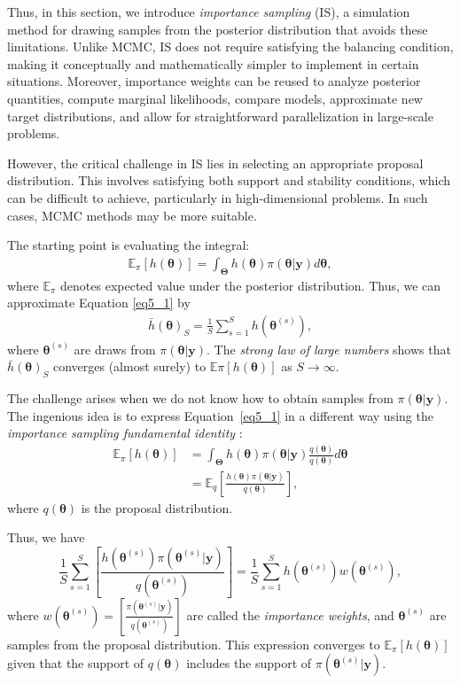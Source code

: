 Thus, in this section, we introduce \textit{importance sampling} (IS), a simulation method for drawing samples from the posterior distribution that avoids these limitations. Unlike MCMC, IS does not require satisfying the balancing condition, making it conceptually and mathematically simpler to implement in certain situations. Moreover, importance weights can be reused to analyze posterior quantities, compute marginal likelihoods, compare models, approximate new target distributions, and allow for straightforward parallelization in large-scale problems.

However, the critical challenge in IS lies in selecting an appropriate proposal distribution. This involves satisfying both support and stability conditions, which can be difficult to achieve, particularly in high-dimensional problems. In such cases, MCMC methods may be more suitable.

The starting point is evaluating the integral:
\begin{align}\label{eq5_1}
	\mathbb{E}_{\pi}[h(\bm{\theta})]=\int_{\bm{\Theta}} h(\bm{\theta}) \pi(\bm{\theta}|\bm{y})d\bm{\theta},
\end{align}
where $\mathbb{E}_{\pi}$ denotes expected value under the posterior distribution.
Thus, we can approximate Equation \ref{eq5_1} by
\begin{align}\label{eq5_2}
	\bar{h}(\bm{\theta})_S=\frac{1}{S}\sum_{s=1}^S h(\bm{\theta}^{(s)}), 
\end{align}
where $\bm{\theta}^{(s)}$ are draws from $\pi(\bm{\theta}|\bm{y})$. The \textit{strong law of large numbers} shows that $\bar{h}(\bm{\theta})_S$ converges (almost surely) to $\mathbb{E}{\pi}[h(\bm{\theta})]$ as $S \rightarrow \infty$.

The challenge arises when we do not know how to obtain samples from $\pi(\bm{\theta}|\bm{y})$. The ingenious idea is to express Equation~\ref{eq5_1} in a different way using the \textit{importance sampling fundamental identity} \cite[Chap.~3]{robert2011monte}:
\begin{align}\label{eq5_3}
	\mathbb{E}_{\pi}[h(\bm{\theta})]&=\int_{\bm{\Theta}} h(\bm{\theta}) \pi(\bm{\theta}|\bm{y})\frac{q(\bm{\theta})}{q(\bm{\theta})}d\bm{\theta}\nonumber\\
	&=\mathbb{E}_{q}\left[\frac{h(\bm{\theta})\pi(\bm{\theta}|\bm{y})}{q(\bm{\theta})}\right],
\end{align}   
where $q(\bm{\theta})$ is the proposal distribution.

Thus, we have $$\frac{1}{S}\sum_{s=1}^S \left[\frac{h(\bm{\theta}^{(s)})\pi(\bm{\theta}^{(s)}|\bm{y})}{q(\bm{\theta}^{(s)})}\right]= \frac{1}{S}\sum_{s=1}^S h(\bm{\theta}^{(s)})w(\bm{\theta}^{(s)}),$$ where $w(\bm{\theta}^{(s)})= \left[\frac{\pi(\bm{\theta}^{(s)}|\bm{y})}{q(\bm{\theta}^{(s)})}\right]$ are called the \textit{importance weights}, and $\bm{\theta}^{(s)}$ are samples from the proposal distribution. This expression converges to $\mathbb{E}_{\pi}[h(\bm{\theta})]$ given that the support of $q(\bm{\theta})$ includes the support of $\pi(\bm{\theta}^{(s)}|\bm{y})$.

